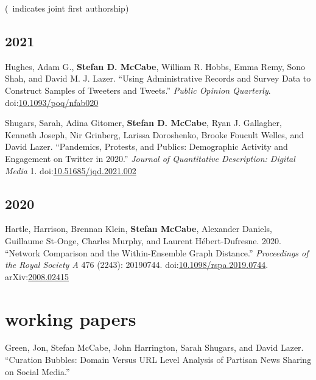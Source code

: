 \documentclass[11pt, letter]{article}
\begin{document}
\vspace{1mm} {\footnotesize (\textdagger\, indicates joint first authorship)}
\subsection*{}

\subsection{2021}

Hughes, Adam G.,\textsuperscript{\textdagger} \textbf{Stefan D. McCabe},\textsuperscript{\textdagger} William R. Hobbs, Emma Remy, Sono Shah, and David M. J. Lazer.  ``Using Administrative Records and Survey Data to Construct Samples of Tweeters and Tweets.'' \textit{Public Opinion Quarterly}. doi:\href{https://doi.org/10.1093/poq/nfab020}{10.1093/poq/nfab020} \vspace{2mm}

Shugars, Sarah, Adina Gitomer, \textbf{Stefan D. McCabe}, Ryan J. Gallagher, Kenneth Joseph, Nir Grinberg, Larissa Doroshenko, Brooke Foucult Welles, and David Lazer. ``Pandemics, Protests, and Publics: Demographic Activity and Engagement on Twitter in 2020.'' \textit{Journal of Quantitative Description: Digital Media} 1. doi:\href{https://doi.org/10.51685/jqd.2021.002}{10.51685/jqd.2021.002}

\subsection{2020}

Hartle, Harrison, Brennan Klein, \textbf{Stefan McCabe}, Alexander Daniels, Guillaume St-Onge, Charles Murphy, and Laurent Hébert-Dufresne. 2020. ``Network Comparison and the Within-Ensemble Graph Distance.'' \textit{Proceedings of the Royal Society A} 476 (2243): 20190744. doi:\href{https://doi.org/10.1098/rspa.2019.0744}{10.1098/rspa.2019.0744}. arXiv:\href{https://arxiv.org/abs/2008.02415}{2008.02415}
\vspace{2mm}
\section{working papers}

Green, Jon, Stefan McCabe, John Harrington, Sarah Shugars, and David Lazer. ``Curation Bubbles: Domain Versus URL Level Analysis of Partisan News Sharing on Social Media.''\vspace{2mm}
\end{document}

